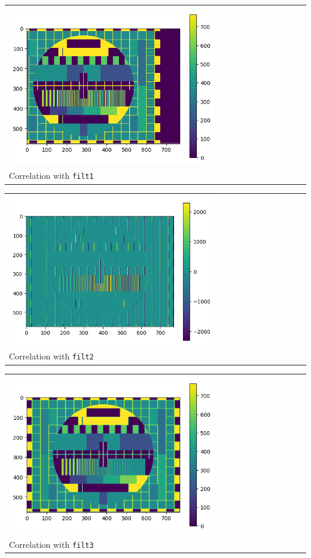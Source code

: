 \documentclass{article}
\begin{document}
\begin{enumerate}[label=(\roman*)]
\begin{tabular}[t]{l}
	\hline \\
	\includegraphics[width=0.7\textwidth]{img/corr_img_filt1.png} \\
	\hline
	Correlation with \texttt{filt1} \\
\end{tabular}

\begin{tabular}[t]{l}
	\hline \\
	\includegraphics[width=0.7\textwidth]{img/corr_img_filt2.png} \\
	\hline
	Correlation with \texttt{filt2} \\
\end{tabular}

\begin{tabular}[t]{l}
	\hline \\
	\includegraphics[width=0.7\textwidth]{img/corr_img_filt3.png} \\
	\hline
	Correlation with \texttt{filt3} \\
\end{tabular}


\end{enumerate}
\end{document}
